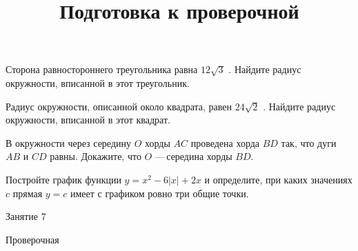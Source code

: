 \begin{homework}[number=3]
\begin{listofex}
		\item Сторона равностороннего треугольника равна \( 12\sqrt{3} \) . Найдите радиус окружности, вписанной в этот треугольник.
		\item Радиус окружности, описанной около квадрата, равен \( 24\sqrt{2} \) . Найдите радиус окружности, вписанной в этот квадрат.
		\item В окружности через середину \( O \) хорды \( AC \) проведена хорда \( BD \) так, что дуги \( AB \) и \( CD \) равны. Докажите, что \( O \) --- середина хорды \( BD \).
		\item Постройте график функции \( y=x^2-6|x|+2x \)  и определите, при каких значениях \( c \) прямая \( y=c \) имеет с графиком ровно три общие точки.
	\end{listofex}
\end{homework}

\begin{class}[number=7]
	\title{Подготовка к проверочной}
	\begin{listofex}
		\item Занятие 7
	\end{listofex}
\end{class}

\begin{exam}
	\begin{listofex}
		\item Проверочная
	\end{listofex}
\end{exam}
